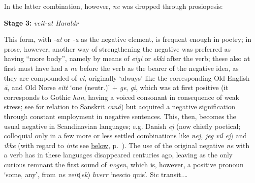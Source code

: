 \bigskip

In the latter combination, however, \textit{ne} was dropped through prosiopesis:

\bigskip

\textbf{Stage 3:} \textit{veit-at Haraldr}

\bigskip

This form, with \textit{-at} or \textit{-a} as the negative element, is frequent enough in poetry; in prose, however, another way of strengthening the negative was preferred as having ``more body'', namely by means of \textit{eigi} or \textit{ekki} after the verb; these also at first must have had a \textit{ne} before the verb as the bearer of the negative idea, as they are compounded of \textit{ei}, originally `always' like the corresponding Old English \textit{ā}, and Old Norse \textit{eitt} `one (neutr.)' %
+ \textit{ge}, \textit{gi}, which was at first positive (it corresponds to Gothic \textit{hun}, having a voiced consonant in consequence of weak stress; see \citet{delbruck_negativen_1910} for relation to Sanskrit \textit{caná}) but acquired a negative signification through constant employment in negative sentences. This, then, becomes the usual negative in Scandinavian languages; e.g. Danish \textit{ej} (now chiefly poetical; colloquial only in a few more or less settled combinations like \textit{nej, jeg vil ej}) and \textit{ikke} (with regard to \textit{inte} see \hyperref[para:inte]{below}, p.~\pageref{para:inte}). The use of the original negative \textit{ne} with a verb has in these languages disappeared centuries ago, leaving as the only curious remnant the first sound of \textit{nogen}, which is, however, a positive pronoun `some, any', from \textit{ne veit}(\textit{ek})\textit{ hverr} `nescio quis'. Sic transit.{\dots}

